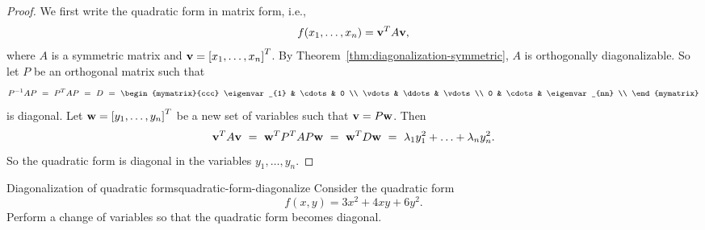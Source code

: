 \begin{proof}
  We first write the quadratic form in matrix form, i.e.,
  \begin{equation*}
    f(x_1,\ldots,x_n) = \vect{v}^T A \vect{v},
  \end{equation*}
  where $A$ is a symmetric matrix and
  $\vect{v}=\mat{x_1,\ldots,x_n}^T$. By
  Theorem~\ref{thm:diagonalization-symmetric}, $A$ is orthogonally
  diagonalizable. So let $P$ be an orthogonal matrix such that
  \begin{equation*}
    P^{-1}AP
    ~=~ P^TAP
    ~=~ D
    ~=~ \begin{mymatrix}{ccc}
      \eigenvar_{1} & \cdots & 0      \\
      \vdots & \ddots & \vdots \\
      0      & \cdots & \eigenvar_{nn} \\
    \end{mymatrix}
  \end{equation*}
  is diagonal. Let $\vect{w}=\mat{y_1,\ldots,y_n}^T$ be a new set of
  variables such that $\vect{v} = P \vect{w}$.  Then
  \begin{equation*}
    \vect{v}^T A \vect{v}
    ~=~ \vect{w}^T P^TAP \vect{w}
    ~=~ \vect{w}^T D \vect{w}
    ~=~ \eigenvar_{1}y_1^2 + \ldots + \eigenvar_{n}y_n^2.
  \end{equation*}
  So the quadratic form is diagonal in the variables $y_1,\ldots,y_n$.
\end{proof}

\begin{example}{Diagonalization of quadratic forms}{quadratic-form-diagonalize}
  Consider the quadratic form
  \begin{equation*}
    f(x,y) = 3x^2 + 4xy + 6y^2.
  \end{equation*}
  Perform a change of variables so that the quadratic form becomes diagonal.
\end{example}

